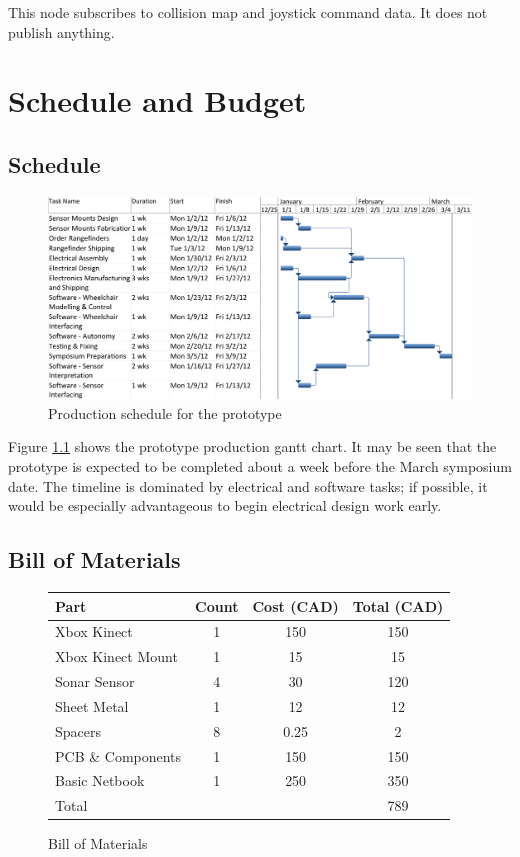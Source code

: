 \documentclass[oneside,final,a4paper]{report}
\begin{document}
This node subscribes to collision map and joystick command data.  It does not publish anything.

\chapter{Schedule and Budget}

\section{Schedule}
\begin{figure}[htb]
 \centering
 \includegraphics[scale=0.6]{gantt.png}
 \caption{Production schedule for the prototype}
 \label{schedule}
\end{figure}

Figure \ref{schedule} shows the prototype production gantt chart.  It may be seen that the prototype is expected to be completed about a week before the March symposium date.  The timeline is dominated by electrical and software tasks; if possible, it would be especially advantageous to begin electrical design work early.

\section{Bill of Materials}
\vspace{0.5cm}
\begin{figure}[ht]
\centering
\begin{tabular}{|l|c|c|c|}
\hline
Part & Count & Cost (CAD) & Total (CAD) \\
\hline \hline
Xbox Kinect & 1 & 150 & 150 \\
\hline
Xbox Kinect Mount & 1& 15 & 15 \\
Sonar Sensor & 4 & 30 & 120 \\
\hline
Sheet Metal & 1 & 12 & 12 \\
\hline
Spacers & 8 & 0.25 & 2 \\
\hline
PCB \& Components & 1 & 150 & 150 \\
\hline
Basic Netbook & 1 & 250 & 350 \\
\hline
\hline
Total&&&789\\
\hline
\end{tabular}
\caption{Bill of Materials}
\label{tab:BOM}
\end{figure}
\end{document}
